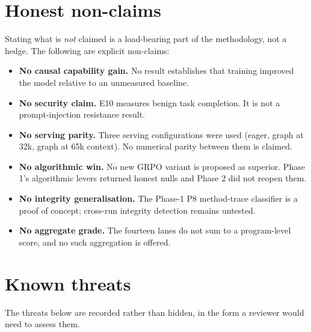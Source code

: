 \section{Honest non-claims}

Stating what is \emph{not} claimed is a load-bearing part of the methodology, not
a hedge. The following are explicit non-claims:

\begin{itemize}[leftmargin=1.4em,itemsep=2pt]
  \item \textbf{No causal capability gain.} No result establishes that training
  improved the model relative to an unmeasured baseline.
  \item \textbf{No security claim.} E10 measures benign task completion. It is not
  a prompt-injection resistance result.
  \item \textbf{No serving parity.} Three serving configurations were used
  (eager, graph at 32k, graph at 65k context). No numerical parity between them is
  claimed.
  \item \textbf{No algorithmic win.} No new GRPO variant is proposed as superior.
  Phase 1's algorithmic levers returned honest nulls and Phase 2 did not reopen
  them.
  \item \textbf{No integrity generalisation.} The Phase-1 P8 method-trace
  classifier is a proof of concept; cross-run integrity detection remains untested.
  \item \textbf{No aggregate grade.} The fourteen lanes do not sum to a
  program-level score, and no such aggregation is offered.
\end{itemize}

\section{Known threats}

The threats below are recorded rather than hidden, in the form a reviewer would
need to assess them.

